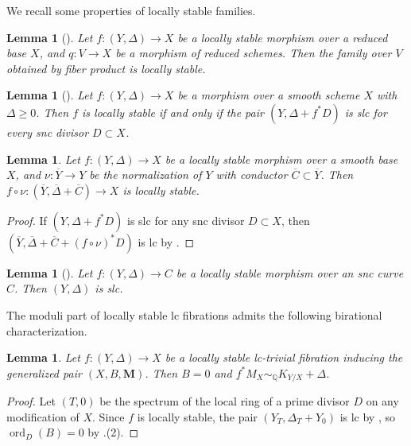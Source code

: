 \documentclass{amsart}
\newcommand{\ord}{\operatorname{ord}}
\newtheorem{lemma}[theorem]{Lemma}
\theoremstyle{definition}
\theoremstyle{remark}
\def\bQ{\mathbb{Q}}
\newcommand\bfM{{\bf M}}
\def\bfM{\mathbf{M}}
\numberwithin{equation}{section}
\begin{document}
We recall some properties of locally stable families.

\begin{lemma}[{\cite[Thm.~4.8]{kbook}}]\label{stabilitylocst} Let $f \colon (Y, \Delta) \to X$ be a locally stable morphism over a
reduced base $X$, and $q\colon V \to X$ be a morphism of reduced schemes. Then the family over
$V$ obtained by fiber product is locally stable.
\end{lemma}

\begin{lemma}[{\cite[Thm.~4.55]{kbook}}]\label{stabilitylocstII} Let $f \colon (Y, \Delta) \to X$ be a morphism over a
smooth scheme $X$ with $\Delta \geq 0$. 
Then $f$ is locally stable if and only if the pair
$(Y, \Delta + f^* D)$ is slc for every snc divisor
$D \subset X$.
\end{lemma}

\begin{lemma}\label{stabilitylocstIII} Let $f \colon (Y, \Delta) \to X$ be a locally stable morphism over a
smooth
base $X$, and $\nu \colon \overline{Y} \to Y$ be the normalization of $Y$ with conductor $\overline{C} \subset \overline{Y}$. 
Then $f \circ \nu \colon (\overline{Y}, \overline{\Delta}+\overline{C}) \to X$ is locally stable.
\end{lemma}
\begin{proof} If $(Y, \Delta + f^* D)$ is slc for any snc divisor $D \subset X$, then  $(\overline{Y}, \overline{\Delta}+\overline{C} + (f \circ \nu)^* D)$ is lc by \cite[Thm.~5.38]{kol13}.
\end{proof}

\begin{lemma}[{\cite[Lem.~2.12]{Z16}}]
Let $f \colon (Y, \Delta) \to C$ be a locally stable morphism over an snc curve $C$. Then $(Y, \Delta)$ is slc.
\end{lemma}

The moduli part of locally stable lc fibrations admits the following birational characterization. 
\begin{lemma}\label{lem:modulipartlctriviallocallystable}
Let $f \colon (Y, \Delta) \to X$ be a locally stable lc-trivial fibration inducing the generalized pair $(X,B, \bfM)$. Then $B=0$ and
$f^*M_X \sim_{\bQ} K_{Y/X} + \Delta$.
\end{lemma}
\begin{proof}
Let $(T, 0)$ be the spectrum of the local ring of a prime divisor $D$ on any modification of $X$. Since $f$ is locally stable, the pair $(Y_T, \Delta_T + Y_0)$ is lc by \cite[(2.3.3)]{kbook}, so $\ord_D(B)=0$ by .(2). 
\end{proof}
\end{document}
